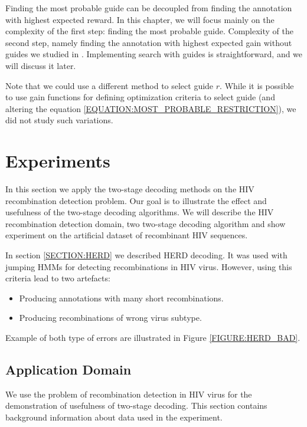 Finding the most probable guide can be decoupled from finding the
annotation with highest expected reward. In this chapter, we will focus
mainly on the complexity of the first step: finding the most
probable guide. Complexity of the second step, namely finding the annotation
with highest expected gain without guides we studied in \cite{Nanasi2010mgr,
Nanasi2010}. Implementing search with guides is straightforward, and we will
discuss it later.

Note that we could use a different method to select guide $r$. While it is
possible to use gain functions for defining optimization criteria to select
guide (and altering the equation \ref{EQUATION:MOST_PROBABLE_RESTRICTION}), 
we did not study such variations.

\section{Experiments}

In this section we apply the two-stage decoding methods on the HIV
recombination detection problem. Our goal is to illustrate the effect and
usefulness of the two-stage decoding algorithms. We will describe the HIV
recombination detection domain, two two-stage decoding algorithm and show
experiment on the artificial dataset of recombinant HIV sequences.

In section \ref{SECTION:HERD} we described HERD decoding. It was used with
jumping HMMs \cite{Schultz2006} for detecting recombinations in HIV virus.
However, using this criteria lead to two artefacts: 
\begin{itemize}[itemsep=-1mm]
\item Producing annotations with many short recombinations.  
\item Producing recombinations of wrong virus subtype.  
\end{itemize}
Example of both type of
errors are illustrated in Figure \ref{FIGURE:HERD_BAD}.

\subsection{Application Domain}
We use the problem of recombination detection in HIV virus for the demonstration of
usefulness of two-stage decoding.  This section contains background information
about data used in the experiment.

